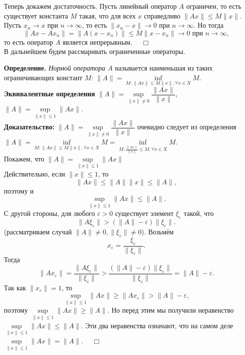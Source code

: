 \documentclass[12pt,a4paper, titlepage]{article}
\begin{document}
Теперь докажем достаточность. Пусть линейный оператор $A$ ограничен, то есть существует константа $M$ такая, что для всех $x$ справедливо $\|Ax\| \leqslant M \|x\|$. Пусть $x_n \to x$ при $n\to\infty$, то есть $\|x_n - x\| \to 0$ при $n\to\infty$. Но тогда
$$
\|Ax - Ax_n\| = \|A(x - x_n)\| \leqslant M \|x - x_n\| \to 0 \text{ при } n\to\infty,
$$
то есть оператор $A$ является непрерывным. $\quad \Box$\\

В дальнейшем будем рассмаривать ограниченные операторы. 

\textbf{Определение.} \textit{Нормой оператора $A$} называется наименьшая из таких ограничивающих констант $M$: $\|A\| = \inf\limits_{M: \|Ax\| \leqslant M\|x\|, \forall x \in X}M$. \\
\textbf{Эквивалентные определения} $\|A\| = \sup\limits_{\|x\| \neq 0} \dfrac {\|Ax\|} {\|x\|}$, $\|A\| = \sup\limits_{\|x\| \leqslant 1} \|Ax\|$. \\
\textbf{Доказательство:} 
 $\|A\| = \sup\limits_{\|x\| \neq 0} \dfrac {\|Ax\|} {\|x\|}$ очевидно следует из определения $\|A\| = \inf\limits_{M: \|Ax\| \leqslant M\|x\|, \forall x \in X}M = \inf\limits_{M: \frac{\|Ax\|}{\|x\|} \leqslant M, \forall x \in X}M$. \\
Покажем, что $\|A\| = \sup\limits_{\|x\| \leqslant 1} \|Ax\|$ \\
Действительно, если $\|x\| \leqslant 1$, то
$$
\|Ax\| \leqslant \|A\| \|x\| \leqslant \|A\|,
$$
поэтому и
$$
\sup_{\|x\| \leqslant 1} \|Ax\| \leqslant \|A\|.
$$
С другой стороны, для любого $\varepsilon > 0$ существует элемент $\xi_\varepsilon$ такой, что
$$
\|A\xi_\varepsilon\| > ( \|A\| - \varepsilon ) \|\xi_\varepsilon\|.
$$
(рассматриваем случай $\|A\| \neq 0, \|\xi_\varepsilon\| \neq 0$). Возьмём 
$$
x_\varepsilon = \frac {\xi_\varepsilon}{\|\xi_\varepsilon\|}.
$$
Тогда
$$
\|A x_\varepsilon\| = \frac {\|A\xi_\varepsilon\|}{\|\xi_\varepsilon\|} > \frac {( \|A\| - \varepsilon ) \|\xi_\varepsilon\|} {\|\xi_\varepsilon\|} = \|A\| - \varepsilon.
$$
Так как $\|x_\varepsilon\| = 1$, то
$$
\sup_{\|x\| \leqslant 1} \|Ax\| \geqslant \|A x_\varepsilon\| > \|A\| - \varepsilon,
$$
поэтому $\sup\limits_{\|x\| \leqslant 1} \|Ax\| \geqslant \|A\|$. Но перед этим мы получили неравенство $\sup\limits_{\|x\| \leqslant 1} \|Ax\| \leqslant \|A\|$. Эти два неравенства означают, что на самом деле $\sup\limits_{\|x\| \leqslant 1} \|Ax\| = \|A\|$. $\quad \Box$\\ \\
\end{document}

